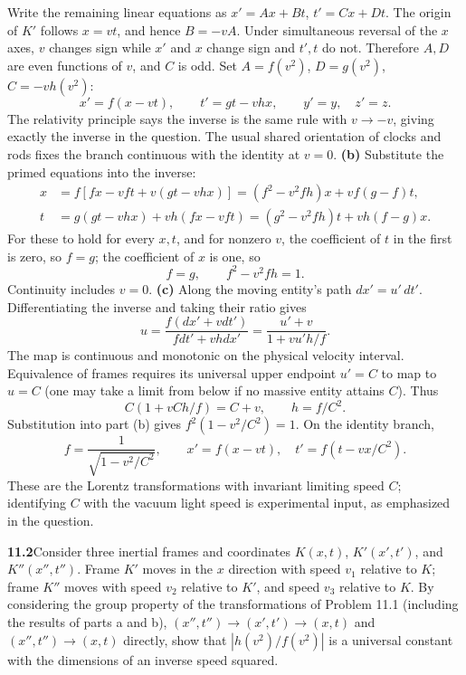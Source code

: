 Write the remaining linear equations as $x'=Ax+Bt$,
$t'=Cx+Dt$. The origin of $K'$ follows $x=vt$, and hence
$B=-vA$. Under simultaneous reversal of the $x$ axes, $v$ changes
sign while $x'$ and $x$ change sign and $t',t$ do not. Therefore
$A,D$ are even functions of $v$, and $C$ is odd. Set
$A=f(v^2)$, $D=g(v^2)$, $C=-vh(v^2)$:
\[
\boxed{x'=f(x-vt),\qquad t'=gt-vhx,\qquad y'=y,\quad z'=z.}
\]
The relativity principle says the inverse is the same rule with
$v\to-v$, giving exactly the inverse in the question. The usual
shared orientation of clocks and rods fixes the branch continuous
with the identity at $v=0$.
\textbf{(b)} Substitute the primed equations into the inverse:
\begin{align*}
x&=f[fx-vft+v(gt-vhx)]
=(f^2-v^2fh)x+vf(g-f)t,\\
t&=g(gt-vhx)+vh(fx-vft)
=(g^2-v^2fh)t+vh(f-g)x.
\end{align*}
For these to hold for every $x,t$, and for nonzero $v$, the
coefficient of $t$ in the first is zero, so $f=g$; the coefficient
of $x$ is one, so
\[
\boxed{f=g,\qquad f^2-v^2fh=1.}
\]
Continuity includes $v=0$.
\textbf{(c)} Along the moving entity's path $dx'=u'\,dt'$.
Differentiating the inverse and taking their ratio gives
\[
u=\frac{f(dx'+vdt')}{fdt'+vhdx'}
=\boxed{\frac{u'+v}{1+vu'h/f}.}
\]
The map is continuous and monotonic on the physical velocity
interval. Equivalence of frames requires its universal upper
endpoint $u'=C$ to map to $u=C$ (one may take a limit from below
if no massive entity attains $C$). Thus
\[
C(1+vCh/f)=C+v,
\qquad\boxed{h=f/C^2}.
\]
Substitution into part (b) gives
$f^2(1-v^2/C^2)=1$. On the identity branch,
\[
\boxed{f=\frac1{\sqrt{1-v^2/C^2}},\qquad
x'=f(x-vt),\quad t'=f(t-vx/C^2).}
\]
These are the Lorentz transformations with invariant limiting speed
$C$; identifying $C$ with the vacuum light speed is experimental
input, as emphasized in the question.

\par\bigskip
\noindent\textbf{11.2}\quad Consider three inertial frames and coordinates $K(x,t)$, $K'(x',t')$, and $K''(x'',t'')$. Frame $K'$ moves in the $x$ direction with speed $v_{1}$ relative to $K$; frame $K''$ moves with speed $v_{2}$ relative to $K'$, and speed $v_{3}$ relative to $K$. By considering the group property of the transformations of Problem 11.1 (including the results of parts a and b), $(x'',t'')\to(x',t')\to(x,t)$ and $(x'',t'')\to(x,t)$ directly, show that $|h(v^{2})/f(v^{2})|$ is a universal constant with the dimensions of an inverse speed squared.

